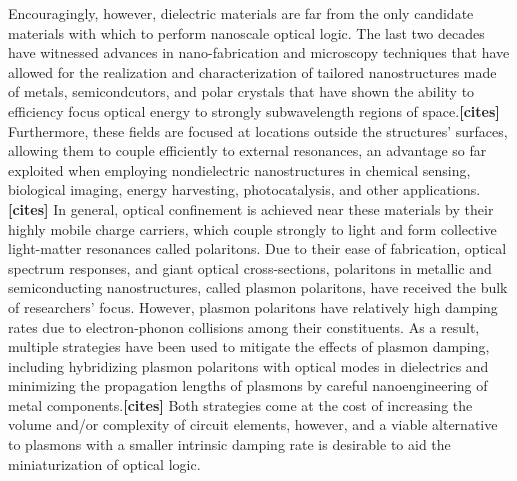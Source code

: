 \documentclass[11pt,a4paper]{article}
\begin{document}
Encouragingly, however, dielectric materials are far from the only candidate materials with which to perform nanoscale optical logic. The last two decades have witnessed advances in nano-fabrication and microscopy techniques that have allowed for the realization and characterization of tailored nanostructures made of metals, semicondcutors, and polar crystals that have shown the ability to efficiency focus optical energy to strongly subwavelength regions of space.\textbf{[cites]} Furthermore, these fields are focused at locations outside the structures' surfaces, allowing them to couple efficiently to external resonances, an advantage so far exploited when employing nondielectric nanostructures in chemical sensing, biological imaging, energy harvesting, photocatalysis, and other applications.\textbf{[cites]} In general, optical confinement is achieved near these materials by their highly mobile charge carriers, which couple strongly to light and form collective light-matter resonances called polaritons. Due to their ease of fabrication, optical spectrum responses, and giant optical cross-sections, polaritons in metallic and semiconducting nanostructures, called plasmon polaritons, have received the bulk of researchers' focus. However, plasmon polaritons have relatively high damping rates due to electron-phonon collisions among their constituents. As a result, multiple strategies have been used to mitigate the effects of plasmon damping, including hybridizing plasmon polaritons with optical modes in dielectrics and minimizing the propagation lengths of plasmons by careful nanoengineering of metal components.\textbf{[cites]} Both strategies come at the cost of increasing the volume and/or complexity of circuit elements, however, and a viable alternative to plasmons with a smaller intrinsic damping rate is desirable to aid the miniaturization of optical logic.
\end{document}
